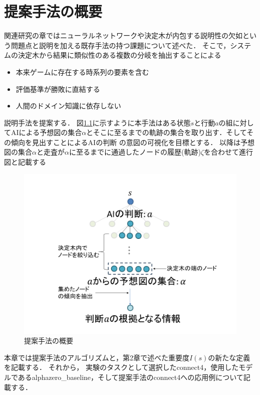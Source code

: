 \chapter{提案手法の概要}
関連研究の章ではニューラルネットワークや決定木が内包する説明性の欠如という問題点と説明を加える既存手法の持つ課題について述べた．
そこで，システムの決定木から結果に類似性のある複数の分岐を抽出することによる
\begin{itemize}
	\item 本来ゲームに存在する時系列の要素を含む
	\item 評価基準が勝敗に直結する
    \item 人間のドメイン知識に依存しない
\end{itemize}
説明手法を提案する．
図\ref{fig:mabs}に示すように本手法はある状態$s$と行動$a$の組に対してAIによる予想図の集合$\alpha$とそこに至るまでの軌跡の集合を取り出す．そしてその傾向を見出すことによるAIの判断
の意図の可視化を目標とする．
以降は予想図の集合$\alpha$と走査が$\alpha$に至るまでに通過したノードの履歴(軌跡)$\zeta$を合わせて進行図と記載する
\begin{figure}[htbp]
    \centering
    \includegraphics[width=\linewidth]{./figure/mabs.png}
    \caption{提案手法の概要}
    \label{fig:mabs}
\end{figure}
本章では提案手法のアルゴリズムと，第2章で述べた重要度$I(s)$の新たな定義を記載する．
それから，
実験のタスクとして選択したconnect4，使用したモデルであるalphazero\_baseline，そして提案手法のconnect4への応用例について記載する．


